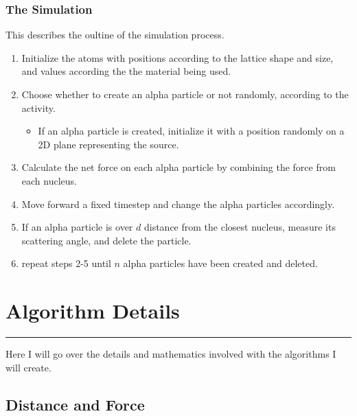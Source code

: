\documentclass[11pt]{article}
\providecommand{\tightlist}{%
      \setlength{\itemsep}{0pt}\setlength{\parskip}{0pt}}
\begin{document}
\hypertarget{the-simulation}{%
\subsubsection{The Simulation}\label{the-simulation}}

This describes the oultine of the simulation process.

\begin{enumerate}
\def\labelenumi{\arabic{enumi}.}
\tightlist
\item
  Initialize the atoms with positions according to the lattice shape and
  size, and values according the the material being used.
\item
  Choose whether to create an alpha particle or not randomly, according
  to the activity.

  \begin{itemize}
  \tightlist
  \item
    If an alpha particle is created, initialize it with a position
    randomly on a 2D plane representing the source.
  \end{itemize}
\item
  Calculate the net force on each alpha particle by combining the force
  from each nucleus.
\item
  Move forward a fixed timestep and change the alpha particles
  accordingly.
\item
  If an alpha particle is over \(d\) distance from the closest nucleus,
  measure its scattering angle, and delete the particle.
\item
  repeat steps 2-5 until \(n\) alpha particles have been created and
  deleted.
\end{enumerate}

\pagebreak
    \hypertarget{algorithm-details}{%
\section{Algorithm Details}\label{algorithm-details}}

\begin{center}\rule{0.5\linewidth}{0.5pt}\end{center}

Here I will go over the details and mathematics involved with the
algorithms I will create.

    \hypertarget{distance-and-force}{%
\subsection{Distance and Force}\label{distance-and-force}}
\end{document}
